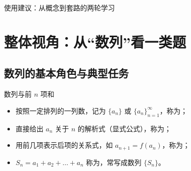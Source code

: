 \documentclass[a4paper,11pt]{ctexart}
\begin{document}
\begin{NoteRoadmap}{使用建议：从概念到套路的两轮学习}
\end{NoteRoadmap}

\clearpage
\section{整体视角：从“数列”看一类题}

\subsection{数列的基本角色与典型任务}

\begin{definitionbox}{数列与前 $n$ 项和}
  \begin{itemize}
    \item 按照一定排列的一列数，记为 $\{a_n\}$ 或 $\{a_n\}_{n=1}^{\infty}$，称为；
    \item 直接给出 $a_n$ 关于 $n$ 的解析式（显式公式），称为；
    \item 用前几项表示后项的关系式，如 $a_{n+1}=f(a_n)$，称为；
    \item $S_n = a_1+a_2+\dots+a_n$ 称为，常写成数列 $\{S_n\}$。
  \end{itemize}
\end{definitionbox}
\end{document}
